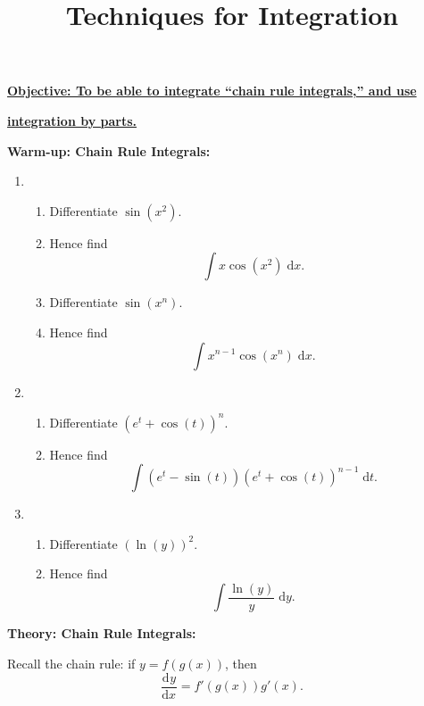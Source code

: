 \documentclass{article}
\newcommand{\deriv}[3][]{\frac{\mathrm{d}^{#1}#2}{\mathrm{d}#3^{#1}}}
\newcommand{\diff}{\;\mathrm{d}}
\begin{document}
\title{Techniques for Integration}
\date{}

\maketitle
\thispagestyle{empty}

\Large

\textbf{\underline{Objective: To be able to integrate ``chain rule integrals,'' and use}}

\textbf{\underline{integration by parts.}}






\vspace{5mm}




\textbf{Warm-up: Chain Rule Integrals:}\bigskip



\begin{enumerate}
	\item 
		\begin{enumerate}
			\item Differentiate $\sin(x^2)$.
			\item Hence find
				\[\int x\cos(x^2)\diff x.\]
			\item Differentiate $\sin(x^n)$.
			\item Hence find
				\[\int x^{n-1}\cos(x^n)\diff x.\]
		\end{enumerate}
	\item
		\begin{enumerate}
			\item Differentiate $(e^t+\cos(t))^n$.
			\item Hence find
				\[\int (e^t-\sin(t))(e^t+\cos(t))^{n-1}\diff t.\]
		\end{enumerate}
	\item
		\begin{enumerate}
			\item Differentiate $(\ln(y))^2$.
			\item Hence find
				\[\int \frac{\ln(y)}{y}\diff y.\]
		\end{enumerate}
\end{enumerate}



\clearpage


\textbf{Theory: Chain Rule Integrals:}

\bigskip


Recall the chain rule: if $y=f(g(x))$, then
\[\deriv{y}{x} = f'(g(x))g'(x).\]
\end{document}
